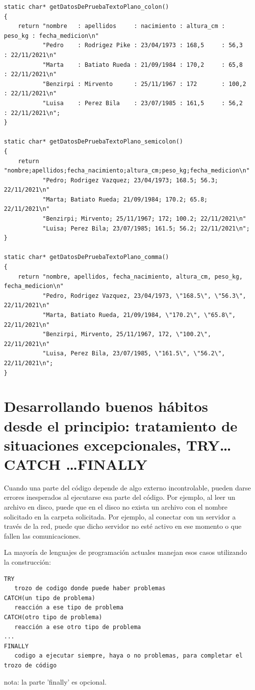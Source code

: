 \documentclass[spanish,12pt,a4paper,final,oneside]{book}
\begin{document}
\begin{lstlisting}[frame=single, caption=lenguaje c]
static char* getDatosDePruebaTextoPlano_colon()
{
    return "nombre   : apellidos     : nacimiento : altura_cm : peso_kg : fecha_medicion\n"
           "Pedro    : Rodrigez Pike : 23/04/1973 : 168,5     : 56,3    : 22/11/2021\n"
           "Marta    : Batiato Rueda : 21/09/1984 : 170,2     : 65,8    : 22/11/2021\n"
           "Benzirpi : Mirvento      : 25/11/1967 : 172       : 100,2   : 22/11/2021\n"
           "Luisa    : Perez Bila    : 23/07/1985 : 161,5     : 56,2    : 22/11/2021\n";
}

static char* getDatosDePruebaTextoPlano_semicolon()
{
    return "nombre;apellidos;fecha_nacimiento;altura_cm;peso_kg;fecha_medicion\n"
           "Pedro; Rodrigez Vazquez; 23/04/1973; 168.5; 56.3; 22/11/2021\n"
           "Marta; Batiato Rueda; 21/09/1984; 170.2; 65.8; 22/11/2021\n"
           "Benzirpi; Mirvento; 25/11/1967; 172; 100.2; 22/11/2021\n"
           "Luisa; Perez Bila; 23/07/1985; 161.5; 56.2; 22/11/2021\n";
}

static char* getDatosDePruebaTextoPlano_comma()
{
    return "nombre, apellidos, fecha_nacimiento, altura_cm, peso_kg, fecha_medicion\n"
           "Pedro, Rodrigez Vazquez, 23/04/1973, \"168.5\", \"56.3\", 22/11/2021\n"
           "Marta, Batiato Rueda, 21/09/1984, \"170.2\", \"65.8\", 22/11/2021\n"
           "Benzirpi, Mirvento, 25/11/1967, 172, \"100.2\", 22/11/2021\n"
           "Luisa, Perez Bila, 23/07/1985, \"161.5\", \"56.2\", 22/11/2021\n";
}

\end{lstlisting}





\chapter{Desarrollando buenos hábitos desde el principio: tratamiento de situaciones excepcionales, TRY\ldots CATCH \ldots FINALLY}
Cuando una parte del código depende de algo externo incontrolable, pueden darse errores inesperados al ejecutarse esa parte del código. Por ejemplo, al leer un archivo en disco, puede que en el disco no exista un archivo con el nombre solicitado en la carpeta solicitada. Por ejemplo, al conectar con un servidor a través de la red, puede que dicho servidor no esté activo en ese momento o que fallen las comunicaciones.

La mayoría de lenguajes de programación actuales manejan esos casos utilizando la construcción:
\begin{lstlisting}
TRY
   trozo de codigo donde puede haber problemas
CATCH(un tipo de problema)
   reacción a ese tipo de problema
CATCH(otro tipo de problema)
   reacción a ese otro tipo de problema
...
FINALLY
   codigo a ejecutar siempre, haya o no problemas, para completar el trozo de código
\end{lstlisting}
nota: la parte 'finally' es opcional.
\end{document}
